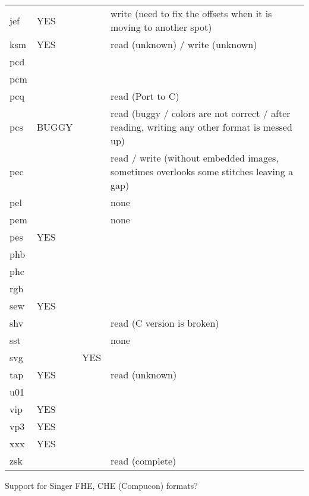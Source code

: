 \begin{longtable}{l l l p{8cm}}
jef    & YES   &       & write (need to fix the offsets when it is moving to another spot) \\
ksm    & YES   &       & read (unknown) / write (unknown) \\
pcd    &       &       &  \\
pcm    &       &       & \\
pcq    &       &       & read (Port to C)\\
pcs    & BUGGY &       & read (buggy / colors are not correct / after reading, writing any other format is messed up)\\
pec    &       &       & read / write (without embedded images, sometimes overlooks some stitches leaving a gap)\\
pel    &       &       & none\\
pem    &       &       & none\\
pes    & YES   &       & \\
phb    &       &       & \\
phc    &       &       & \\
rgb    &       &       & \\
sew    & YES   &       & \\
shv    &       &       & read (C version is broken)\\
sst    &       &       & none\\
svg    &       & YES   & \\
tap    & YES   &       & read (unknown)\\
u01    &       &       & \\
vip    & YES   &       & \\
vp3    & YES   &       & \\
xxx    & YES   &       & \\
zsk    &       &       & read (complete)
\end{longtable}

Support for Singer FHE, CHE (Compucon) formats?